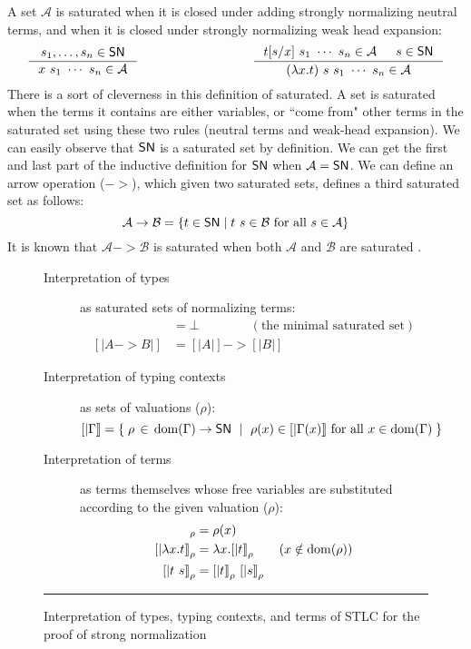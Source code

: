 A set $\mathcal{A}$ is saturated when it is closed under adding
strongly normalizing neutral terms, and when it is closed under strongly normalizing weak head expansion:
\[
\inference{s_1,\ldots,s_n\in\SN}{x~s_1~\cdots~s_n \in \mathcal{A}}
\qquad\qquad\qquad\qquad\quad
\inference{t[s/x]~s_1~\cdots~s_n\in \mathcal{A} & s\in\SN}
	  {(\l x.t)~s~s_1~\cdots~s_n \in \mathcal{A}}
\]
There is a sort of cleverness in this definition of saturated.
A set is saturated when the terms it contains are either variables,
or ``come from" other terms in the saturated set using these two rules
(neutral terms and weak-head expansion). We can easily observe that $\mathsf{SN}$ is
a saturated set by definition.  We can get the first and last part of
the inductive definition for $\mathsf{SN}$ when $\mathcal{A}=\mathsf{SN}$. We can define
an arrow operation ($->$), which given two saturated sets, defines
a third saturated set as follows:
\[ \mathcal{A} -> \mathcal{B} =
  \{ t \in \mathsf{SN} \mid t~s \in \mathcal{B} ~\text{for all}~ s \in \mathcal{A} \} \]
It is known that $\mathcal{A} -> \mathcal{B}$ is saturated
when both $\mathcal{A}$ and $\mathcal{B}$ are saturated \cite{Tait75}.

\begin{figure}
\begin{singlespace}
\begin{description}
\item[Interpretation of types] as saturated sets of normalizing terms:
\begin{align*}
[| \iota  |] &= \bot \qquad\qquad (\text{the minimal saturated set}) \\
[| A -> B |] &= [| A |] -> [| B |]
\end{align*}

\item[Interpretation of typing contexts] as sets of valuations ($\rho$):
\[ [| \Gamma |] =
	\{\; \rho\,\in\,\mathop{\mathrm{dom}}(\Gamma) -> \mathsf{SN} ~\mid~
             \rho(x) \in [|\Gamma(x)|] ~\text{for all}~x\in\mathop{\mathrm{dom}}(\Gamma) \;\}
\]

\item[Interpretation of terms] as terms themselves whose free variables are
	substituted according to the given valuation ($\rho$):
\begin{align*}
[|x|]_\rho      &= \rho(x) \\
[|\l x.t|]_\rho &= \l x.[|t|]_\rho  \qquad (x\notin\dom(\rho)) \\
[|t~s|]_\rho    &= [|t|]_\rho~[|s|]_\rho
\end{align*}
\end{description}
\caption[Interpretation of STLC for proving strong normalization]
	{Interpretation of types, typing contexts, and terms of STLC
         for the proof of strong normalization}
\label{fig:interpSTLC}
\end{singlespace}
\vspace*{.5em}\hrule
\end{figure}

